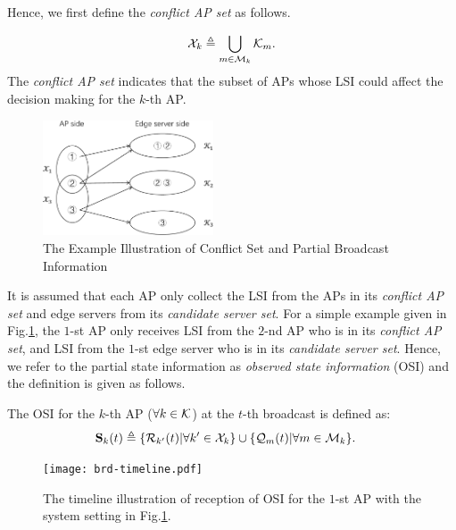 Hence, we first define the \emph{conflict AP set} as follows.
\begin{definition}
    \begin{align}
        \mathcal{X}_{k} \triangleq \bigcup_{m\in\mathcal{M}_{k}} \mathcal{K}_{m}.
    \end{align}
    The \emph{conflict AP set} indicates that the subset of APs whose LSI could affect the decision making for the $k$-th AP.
\end{definition}

\begin{figure}[tp]
    \centering
    \includegraphics[width=0.45\textwidth]{images/conflict.pdf}
    \caption{The Example Illustration of Conflict Set and Partial Broadcast Information}
    \label{fig:conflict}
\end{figure}

It is assumed that each AP only collect the LSI from the APs in its \emph{conflict AP set} and edge servers from its \emph{candidate server set}.
For a simple example given in Fig.\ref{fig:conflict}, the $1$-st AP only receives LSI from the $2$-nd AP who is in its \emph{conflict AP set}, and LSI from the $1$-st edge server who is in its \emph{candidate server set}.
Hence, we refer to the partial state information as \emph{observed state information} (OSI) and the definition is given as follows.
\begin{definition}
    The OSI for the $k$-th AP ($\forall k\in\mathcal{K}$) at the $t$-th broadcast is defined as:
    \begin{align}
        \mathbf{S}_{k}(t) &\triangleq \{\mathcal{R}_{k'}(t) | \forall k'\in\mathcal{X}_{k}\}
                         \cup \{\mathcal{Q}_{m}(t) | \forall m\in\mathcal{M}_{k}\}.
        \label{def:OSI}
    \end{align}
\end{definition}

\begin{figure}[t]
    \centering
    \texttt{[image: brd-timeline.pdf]}
    \caption{The timeline illustration of reception of OSI for the $1$-st AP with the system setting in Fig.\ref{fig:conflict}.}
    \label{fig:brd-timeline}
\end{figure}

